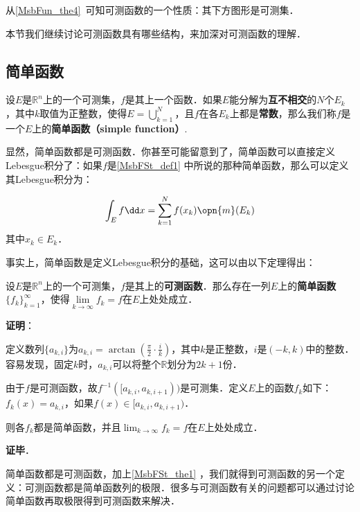 

从\autoref{MsbFun_the4}~可知可测函数的一个性质：其下方图形是可测集．

本节我们继续讨论可测函数具有哪些结构，来加深对可测函数的理解．

\subsection{简单函数}

\begin{definition}{}\label{MsbFSt_def1}
设$E$是$\mathbb{R}^n$上的一个可测集，$f$是其上一个函数．如果$E$能分解为\textbf{互不相交}的$N$个$E_k$，其中$k$取值为正整数，使得$E=\bigcup_{k=1}^N$，且$f$在各$E_k$上都是\textbf{常数}，那么我们称$f$是一个$E$上的\textbf{简单函数（simple function）}.
\end{definition}

显然，简单函数都是可测函数．你甚至可能留意到了，简单函数可以直接定义Lebesgue积分了：如果$f$是\autoref{MsbFSt_def1} 中所说的那种简单函数，那么可以定义其Lebesgue积分为：

\begin{equation}
\int_E f \dd x = \sum_{k=1}^N f(x_k) \opn{m}(E_k)
\end{equation}
其中$x_k\in E_k$．

事实上，简单函数是定义Lebesgue积分的基础，这可以由以下定理得出：

\begin{theorem}{}\label{MsbFSt_the1}
设$E$是$\mathbb{R}^n$上的一个可测集，$f$是其上的\textbf{可测函数}．那么存在一列$E$上的\textbf{简单函数}$\{f_k\}_{k=1}^\infty$，使得$\lim\limits_{k\to\infty}f_k=f$在$E$上处处成立．
\end{theorem}

\textbf{证明}：

定义数列$\{a_{k, i}\}$为$a_{k, i}=\arctan(\frac{\pi}{2}\cdot\frac{i}{k})$，其中$k$是正整数，$i$是$(-k, k)$中的整数．容易发现，固定$k$时，$a_{k, i}$可以将整个$\mathbb{R}$划分为$2k+1$份．

由于$f$是可测函数，故$f^{-1}([a_{k, i}, a_{k, i+1}))$是可测集．定义$E$上的函数$f_k$如下：$f_k(x)=a_{k, i}$，如果$f(x)\in [a_{k, i}, a_{k, i+1})$．

则各$f_k$都是简单函数，并且$\lim_{k\to\infty}f_k=f$在$E$上处处成立．

\textbf{证毕}．

简单函数都是可测函数，加上\autoref{MsbFSt_the1} ，我们就得到可测函数的另一个定义：可测函数都是简单函数列的极限．很多与可测函数有关的问题都可以通过讨论简单函数再取极限得到可测函数来解决．



